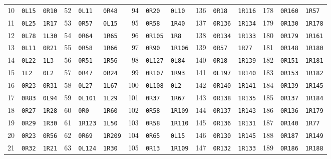 \begin{center}
\begin{tabular}{rll@{\qquad}rll@{\qquad}rll@{\qquad}rll@{\qquad}rll}
10 & \texttt{0L15} & \texttt{0R10} & 52 & \texttt{0L11} & \texttt{0R48} & 94 & \texttt{0R20} & \texttt{0L10} & 136 & \texttt{0R18} & \texttt{1R116} & 178 & \texttt{0R160} & \texttt{1R57} \\
11 & \texttt{0L25} & \texttt{1R17} & 53 & \texttt{0R57} & \texttt{0L15} & 95 & \texttt{0R58} & \texttt{1R40} & 137 & \texttt{0R136} & \texttt{1R134} & 179 & \texttt{0R130} & \texttt{1R178} \\
12 & \texttt{0L78} & \texttt{1L30} & 54 & \texttt{0R64} & \texttt{1R65} & 96 & \texttt{0R105} & \texttt{1R8} & 138 & \texttt{0R134} & \texttt{1R133} & 180 & \texttt{0R179} & \texttt{1R161} \\
13 & \texttt{0L11} & \texttt{0R21} & 55 & \texttt{0R58} & \texttt{1R66} & 97 & \texttt{0R90} & \texttt{1R106} & 139 & \texttt{0R57} & \texttt{1R77} & 181 & \texttt{0R148} & \texttt{1R180} \\
14 & \texttt{0L22} & \texttt{1L3} & 56 & \texttt{0R51} & \texttt{1R56} & 98 & \texttt{0L127} & \texttt{0L84} & 140 & \texttt{0R18} & \texttt{1R139} & 182 & \texttt{0R151} & \texttt{1R181} \\
15 & \texttt{1L2} & \texttt{0L2} & 57 & \texttt{0R47} & \texttt{0R24} & 99 & \texttt{0R107} & \texttt{1R93} & 141 & \texttt{0L197} & \texttt{1R140} & 183 & \texttt{0R153} & \texttt{1R182} \\
16 & \texttt{0R23} & \texttt{0R31} & 58 & \texttt{0L27} & \texttt{1L67} & 100 & \texttt{0L108} & \texttt{0L2} & 142 & \texttt{0R140} & \texttt{1R141} & 184 & \texttt{0R139} & \texttt{1R145} \\
17 & \texttt{0R83} & \texttt{0L94} & 59 & \texttt{0L101} & \texttt{1L29} & 101 & \texttt{0R37} & \texttt{1R67} & 143 & \texttt{0R138} & \texttt{1R135} & 185 & \texttt{0R137} & \texttt{1R184} \\
18 & \texttt{0R27} & \texttt{1R28} & 60 & \texttt{0R0} & \texttt{1R60} & 102 & \texttt{0R58} & \texttt{1R109} & 144 & \texttt{0R137} & \texttt{1R143} & 186 & \texttt{0R136} & \texttt{1R179} \\
19 & \texttt{0R29} & \texttt{1R30} & 61 & \texttt{1R123} & \texttt{1L50} & 103 & \texttt{0R58} & \texttt{1R110} & 145 & \texttt{0R136} & \texttt{1R131} & 187 & \texttt{0R140} & \texttt{1R77} \\
20 & \texttt{0R23} & \texttt{0R56} & 62 & \texttt{0R69} & \texttt{1R209} & 104 & \texttt{0R65} & \texttt{0L15} & 146 & \texttt{0R130} & \texttt{1R145} & 188 & \texttt{0R187} & \texttt{1R149} \\
21 & \texttt{0R32} & \texttt{1R21} & 63 & \texttt{0L124} & \texttt{1R30} & 105 & \texttt{0R13} & \texttt{1R109} & 147 & \texttt{0R132} & \texttt{1R133} & 189 & \texttt{0R186} & \texttt{1R188} \\

\end{tabular}
\end{center}
